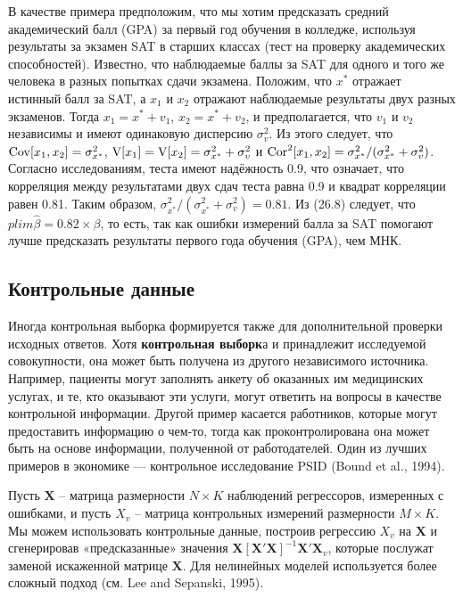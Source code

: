 В качестве примера предположим, что мы хотим предсказать средний академический балл (GPA) за первый год обучения в колледже, используя результаты за экзамен SAT в старших классах (тест на проверку академических способностей). Известно, что наблюдаемые баллы за SAT для одного и того же человека в разных попытках сдачи экзамена. Положим, что $x^*$ отражает истинный балл за SAT, а $x_1$ и $x_2$ отражают наблюдаемые результаты двух разных экзаменов. Тогда $x_1=x^*+v_1$, $x_2=x^*+v_2$, и предполагается, что $v_1$ и $v_2$ независимы и имеют одинаковую дисперсию $\sigma^2_v$. Из этого следует, что $\mathrm{Cov}[x_1, x_2]=\sigma^2_{x^*}$, $\mathrm{V}[x_1]=\mathrm{V}[x_2]=\sigma^2_{x^*}+\sigma^2_v$ и $\mathrm{Cor}^2[x_1,x_2]=\sigma^2_{x^*} / (\sigma^2_{x^*}+\sigma^2_v)$. Согласно исследованиям, теста имеют надёжность 0.9, что означает, что корреляция между результатами двух сдач теста равна 0.9 и квадрат корреляции равен 0.81. Таким образом, $\sigma^2_{x^*} / (\sigma^2_{x^*}+\sigma^2_v)=0.81$. Из (26.8) следует, что $plim \widehat{\beta}=0.82 \times \beta$, то есть, так как ошибки измерений балла за SAT помогают лучше предсказать результаты первого года обучения (GPA), чем МНК.

\subsection{Контрольные данные} 
Иногда контрольная выборка формируется также для дополнительной проверки исходных ответов. Хотя {\bf контрольная выборк}а и принадлежит исследуемой совокупности, она может быть получена из другого независимого источника. Например, пациенты могут заполнять анкету об оказанных им медицинских услугах, и те, кто оказывают эти услуги, могут ответить на вопросы в качестве контрольной информации. Другой пример касается работников, которые могут предоставить информацию о чем-то, тогда как проконтролирована она может быть на основе информации, полученной от работодателей. Один из лучших примеров в экономике –-- контрольное исследование PSID (Bound et al., 1994).

Пусть $\mathbf{X}$ – матрица размерности $N \times K$ наблюдений регрессоров, измеренных с ошибками, и пусть $X_v$ – матрица контрольных измерений размерности $M \times K$. Мы можем использовать контрольные данные, построив регрессию $X_v$ на $\mathbf{X}$ и сгенерировав «предсказанные» значения $\mathbf{X[X'X]}^{-1} \mathbf{X'X}_v$, которые послужат заменой искаженной матрице $\mathbf{X}$. Для нелинейных моделей используется более сложный подход (см. Lee and Sepanski, 1995).

